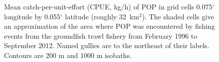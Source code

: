 \clearpage




\begin{figure}[htp]
\begin{center}
\epsfxsize=6in
\end{center}
\vspace{-17mm}
\caption{Mean catch-per-unit-effort (CPUE, kg/h) of POP in grid cells 0.075$^\circ$ longitude by 0.055$^\circ$ latitude (roughly 32~km$^2$). The shaded cells give an approximation of the area where POP was encountered by fishing events from the groundfish trawl fishery from February 1996 to September 2012. Named gullies are to the northeast of their labels. Contours are 200 m and 1000 m isobaths.}
\label{fig:cpue} 
\end{figure}







